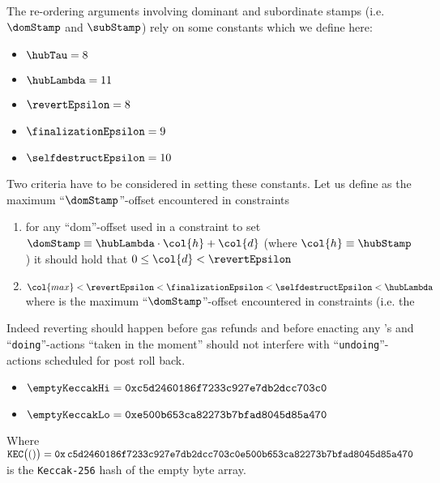 The re-ordering arguments involving dominant and subordinate stamps (i.e. $\domStamp$ and $\subStamp$) rely on some constants which we define here:
\begin{itemize}
	\item $\hubTau              =  8$
	\item $\hubLambda           = 11$
	\item $\revertEpsilon       =  8$
	\item $\finalizationEpsilon =  9$
	\item $\selfdestructEpsilon = 10$
\end{itemize}
Two criteria have to be considered in setting these constants.
Let us define  as the maximum ``$\domStamp$''-offset encountered in constraints
\begin{enumerate}
	\item for any ``dom''-offset  used in a constraint to set $\domStamp \equiv \hubLambda \cdot \col{h} + \col{d}$ (where $\col{h} \equiv \hubStamp$) it should hold that $0 \leq \col{d} < \revertEpsilon$
	\item $\col{max} < \revertEpsilon < \finalizationEpsilon < \selfdestructEpsilon < \hubLambda$ where  is the maximum ``$\domStamp$''-offset encountered in constraints (i.e. the 
\end{enumerate}
Indeed reverting should happen before gas refunds and before enacting any 's and ``\texttt{doing}''-actions ``taken in the moment'' should not interfere with ``\texttt{undoing}''-actions scheduled for post roll back.
\begin{itemize}
	\item $\emptyKeccakHi = \texttt{0xc5d2460186f7233c927e7db2dcc703c0}$
	\item $\emptyKeccakLo = \texttt{0xe500b653ca82273b7bfad8045d85a470}$
\end{itemize}
Where $\texttt{KEC}\big(()\big) = \texttt{0x\,c5d2460186f7233c927e7db2dcc703c0e500b653ca82273b7bfad8045d85a470}$ is the \texttt{Keccak-256} hash of the empty byte array.
